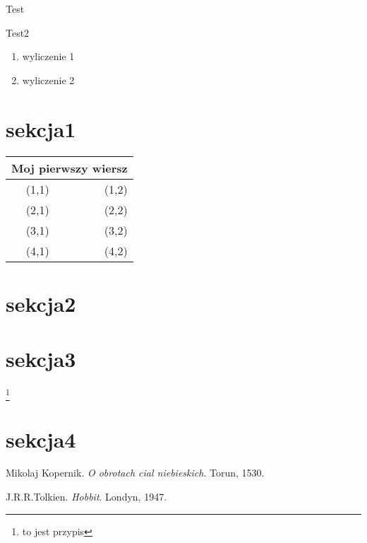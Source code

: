\documentclass[]{article}
\author{Marcin Tomczyk}
\date{23.10.2018}
\begin{document}
\indent %


Test
\noindent
\begin{center}
Test2			%
\end{center}
 
\begin{enumerate}
\item wyliczenie 1
\item wyliczenie 2
\end{enumerate}
\tableofcontents



\section{sekcja1}
\blindtext %
\begin{tabular}{||c|r||} \hline		%
\multicolumn{2}{||c||}{Moj pierwszy wiersz}
\\ \hline \hline
(1,1) & (1,2) \\
(2,1) & (2,2) \\ \hline
(3,1) & (3,2) \\
(4,1) & (4,2) \\ \hline
\end{tabular}

\footnotemark %
\section{sekcja2}
\blindtext

\section{sekcja3}
\blindtext

\footnote[1]{to jest przypis}
\section{sekcja4}
\blindtext

\begin{thebibliography}{9}
\bibitem {} Mikolaj Kopernik. 
\textit{O obrotach cial niebieskich}. 
 Torun, 1530.
 
 \bibitem {} J.R.R.Tolkien. 
\textit{Hobbit}. 
 Londyn, 1947.


\end{thebibliography}
\end{document}
